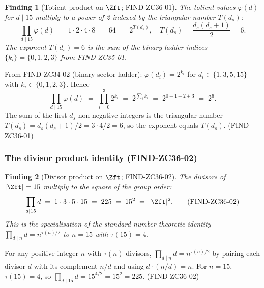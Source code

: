 \documentclass[12pt, a4paper]{article}
\newtheorem{finding}{Finding}[section]
\begin{document}
\begin{finding}[Totient product on $\Zft$; FIND-ZC36-01]
\label{find:zc36-01}
The totient values $\varphi(d)$ for $d \mid 15$ multiply to a
power of 2 indexed by the triangular number $T(d_s)$:
\begin{equation}
  \prod_{d \mid 15} \varphi(d)
  \;=\; 1 \cdot 2 \cdot 4 \cdot 8
  \;=\; 64
  \;=\; 2^{T(d_s)},
  \quad T(d_s) = \frac{d_s(d_s+1)}{2} = 6.
  \tag{FIND-ZC36-01}\label{eq:find-zc36-01}
\end{equation}
The exponent $T(d_s) = 6$ is the sum of the binary-ladder
indices $\{k_i\} = \{0,1,2,3\}$ from FIND-ZC35-01.
\end{finding}

\begin{derivedbox}[title={FIND-ZC36-01: Derivation}]
From FIND-ZC34-02 (binary sector ladder):
$\varphi(d_i) = 2^{k_i}$ for $d_i \in \{1,3,5,15\}$ with
$k_i \in \{0,1,2,3\}$. Hence
\[
  \prod_{d \mid 15} \varphi(d)
  \;=\; \prod_{i=0}^{3} 2^{k_i}
  \;=\; 2^{\sum_i k_i}
  \;=\; 2^{0+1+2+3}
  \;=\; 2^6.
\]
The sum of the first $d_s$ non-negative integers is the
triangular number $T(d_s) = d_s(d_s+1)/2 = 3\cdot 4/2 = 6$,
so the exponent equals $T(d_s)$.
\hfill\textup{(FIND-ZC36-01)}
\end{derivedbox}

\subsubsection{The divisor product identity (FIND-ZC36-02)}

\begin{finding}[Divisor product on $\Zft$; FIND-ZC36-02]
\label{find:zc36-02}
The divisors of $|\Zft| = 15$ multiply to the square of the
group order:
\begin{equation}
  \prod_{d \mid 15} d
  \;=\; 1 \cdot 3 \cdot 5 \cdot 15
  \;=\; 225
  \;=\; 15^2
  \;=\; |\Zft|^2.
  \tag{FIND-ZC36-02}\label{eq:find-zc36-02}
\end{equation}
This is the specialisation of the standard number-theoretic
identity $\prod_{d \mid n} d = n^{\tau(n)/2}$ to $n = 15$
with $\tau(15) = 4$.
\end{finding}

\begin{derivedbox}[title={FIND-ZC36-02: Derivation}]
For any positive integer $n$ with $\tau(n)$ divisors,
$\prod_{d \mid n} d = n^{\tau(n)/2}$ by pairing each divisor
$d$ with its complement $n/d$ and using
$d \cdot (n/d) = n$. For $n = 15$, $\tau(15) = 4$, so
$\prod_{d \mid 15} d = 15^{4/2} = 15^2 = 225$.
\hfill\textup{(FIND-ZC36-02)}
\end{derivedbox}
\end{document}
